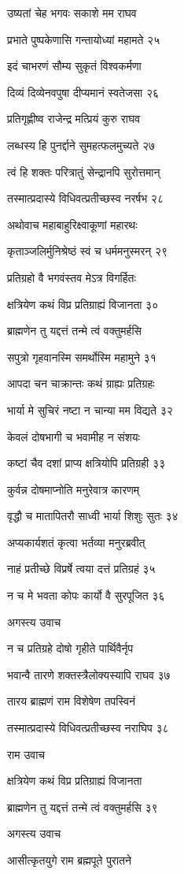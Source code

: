 उष्यतां चेह भगवः सकाशे मम राघव

प्रभाते पुष्पकेणासि गन्तायोध्यां महामते २५

इदं चाभरणं सौम्य सुकृतं विश्वकर्मणा

दिव्यं दिव्येनवपुषा दीप्यमानं स्वतेजसा २६

प्रतिगृह्णीष्व राजेन्द्र मत्प्रियं कुरु राघव

लब्धस्य हि पुनर्द्दाने सुमहत्फलमुच्यते २७

त्वं हि शक्तः परित्रातुं सेन्द्रानपि सुरोत्तमान्

तस्मात्प्रदास्ये विधिवत्प्रतीच्छस्व नरर्षभ २८

अथोवाच महाबाहुरिक्ष्वाकूणां महारथः

कृताञ्जलिर्मुनिश्रेष्ठं स्वं च धर्ममनुस्मरन् २९

प्रतिग्रहो वै भगवंस्तव मेऽत्र विगर्हितः

क्षत्रियेण कथं विप्र प्रतिग्राह्यं विजानता ३०

ब्राह्मणेन तु यद्दत्तं तन्मे त्वं वक्तुमर्हसि

सपुत्रो गृहवानस्मि समर्थोस्मि महामुने ३१

आपदा चन चाक्रान्तः कथं ग्राह्यः प्रतिग्रहः

भार्या मे सुचिरं नष्टा न चान्या मम विद्यते ३२

केवलं दोषभागी च भवामीह न संशयः

कष्टां चैव दशां प्राप्य क्षत्रियोपि प्रतिग्रही ३३

कुर्वन्न दोषमाप्नोति मनुरेवात्र कारणम्

वृद्धौ च मातापितरौ साध्वी भार्या शिशुः सुतः ३४

अप्यकार्यशतं कृत्वा भर्तव्या मनुरब्रवीत्

नाहं प्रतीच्छे विप्रर्षे त्वया दत्तं प्रतिग्रहं ३५

न च मे भवता कोपः कार्यो वै सुरपूजित ३६

अगस्त्य उवाच

न च प्रतिग्रहे दोषो गृहीते पार्थिवैर्नृप

भवान्वै तारणे शक्तस्त्रैलोक्यस्यापि राघव ३७

तारय ब्राह्मणं राम विशेषेण तपस्विनं

तस्मात्प्रदास्ये विधिवत्प्रतीच्छस्व नराघिप ३८

राम उवाच

क्षत्रियेण कथं विप्र प्रतिग्राह्यं विजानता

ब्राह्मणेन तु यद्दत्तं तन्मे त्वं वक्तुमर्हसि ३९

अगस्त्य उवाच

आसीत्कृतयुगे राम ब्रह्मपूते पुरातने

